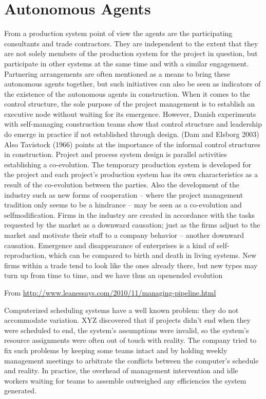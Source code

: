 \section{Autonomous Agents}

From a production system point of view the agents are the participating consultants and trade
contractors. They are independent to the extent that they are not solely members of the production
system for the project in question, but participate in other systems at the same time
and with a similar engagement. Partnering arrangements are often mentioned as a means to
bring these autonomous agents together, but such initiatives can also be seen as indicators of
the existence of the autonomous agents in construction. When it comes to the control structure,
the sole purpose of the project management is to establish an executive node without
waiting for its emergence. However, Danish experiments with self-managing construction
teams show that control structure and leadership do emerge in practice if not established
through design. (Dam and Elsborg 2003) Also Tavistock (1966) points at the importance of
the informal control structures in construction.
Project and process system design is parallel activities establishing a co-evolution. The
temporary production system is developed for the project and each project’s production system
has its own characteristics as a result of the co-evolution between the parties. Also the
development of the industry such as new forms of cooperation – where the project management
tradition only seems to be a hindrance – may be seen as a co-evolution and selfmodification.
Firms in the industry are created in accordance with the tasks requested by the market as
a downward causation; just as the firms adjust to the market and motivate their staff to a
company behavior – another downward causation.
Emergence and disappearance of enterprises is a kind of self-reproduction, which can be
compared to birth and death in living systems. New firms within a trade tend to look like the ones already there, but new types may turn up from time to time, and we have thus an openended
evolution


From \url{http://www.leanessays.com/2010/11/managing-pipeline.html}

Computerized scheduling systems have a well known problem: they do not accommodate variation. XYZ discovered that if projects didn’t end when they were scheduled to end, the system’s assumptions were invalid, so the system’s resource assignments were often out of touch with reality. The company tried to fix such problems by keeping some teams intact and by holding weekly management meetings to arbitrate the conflicts between the computer’s schedule and reality. In practice, the overhead of management intervention and idle workers waiting for teams to assemble outweighed any efficiencies the system generated.


